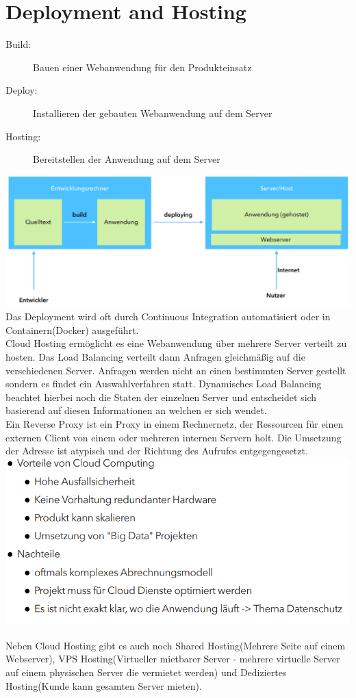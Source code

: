 \documentclass[12pt,a4paper]{article}
\begin{document}
\section{Deployment and Hosting}
\begin{description}
	\item[Build:] Bauen einer Webanwendung für den Produkteinsatz
	\item[Deploy:] Installieren der gebauten Webanwendung auf dem Server
	\item[Hosting:] Bereitstellen der Anwendung auf dem Server
\end{description}
\includegraphics[width=\textwidth]{Bilder/deploy_and_host.PNG}
Das Deployment wird oft durch Continuous Integration automatisiert oder in Containern(Docker) ausgeführt.\\
Cloud Hosting ermöglicht es eine Webanwendung über mehrere Server verteilt zu hosten. Das Load Balancing verteilt dann Anfragen gleichmäßig auf die verschiedenen Server. Anfragen werden nicht an einen bestimmten Server gestellt sondern es findet ein Auswahlverfahren statt. Dynamisches Load Balancing beachtet hierbei noch die Staten der einzelnen Server und entscheidet sich basierend auf diesen Informationen an welchen er sich wendet. \\
Ein Reverse Proxy ist ein Proxy in einem Rechnernetz, der Ressourcen für einen externen Client von einem oder mehreren internen Servern holt. Die Umsetzung der Adresse ist atypisch und der Richtung des Aufrufes entgegengesetzt.\\
\includegraphics[width=\textwidth]{Bilder/vorteile_nachteile_cloud_hosting.PNG}\\\\
Neben Cloud Hosting gibt es auch noch Shared Hosting(Mehrere Seite auf einem Webserver), VPS Hosting(Virtueller mietbarer Server - mehrere virtuelle Server auf einem physischen Server die vermietet werden) und Dediziertes Hosting(Kunde kann gesamten Server mieten).
\end{document}
